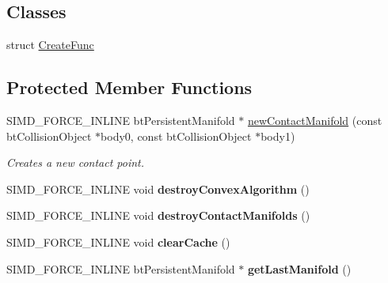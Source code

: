 \subsection*{Classes}
\begin{DoxyCompactItemize}
\item 
struct \hyperlink{structbtGImpactCollisionAlgorithm_1_1CreateFunc}{Create\+Func}
\end{DoxyCompactItemize}
\subsection*{Protected Member Functions}
\begin{DoxyCompactItemize}
\item 
\mbox{\label{classbtGImpactCollisionAlgorithm_a39b6aae298182026902401b138ebd716}} 
S\+I\+M\+D\+\_\+\+F\+O\+R\+C\+E\+\_\+\+I\+N\+L\+I\+NE bt\+Persistent\+Manifold $\ast$ \hyperlink{classbtGImpactCollisionAlgorithm_a39b6aae298182026902401b138ebd716}{new\+Contact\+Manifold} (const bt\+Collision\+Object $\ast$body0, const bt\+Collision\+Object $\ast$body1)
\begin{DoxyCompactList}\small\item\em Creates a new contact point. \end{DoxyCompactList}\item 
\mbox{\label{classbtGImpactCollisionAlgorithm_a6fba8aeaadd20c3d882f20088fbeffdc}} 
S\+I\+M\+D\+\_\+\+F\+O\+R\+C\+E\+\_\+\+I\+N\+L\+I\+NE void {\bfseries destroy\+Convex\+Algorithm} ()
\item 
\mbox{\label{classbtGImpactCollisionAlgorithm_a5d5bc255d50740600f6b112b29450c3f}} 
S\+I\+M\+D\+\_\+\+F\+O\+R\+C\+E\+\_\+\+I\+N\+L\+I\+NE void {\bfseries destroy\+Contact\+Manifolds} ()
\item 
\mbox{\label{classbtGImpactCollisionAlgorithm_a915bad958b4e36822919ff4f0be0bea6}} 
S\+I\+M\+D\+\_\+\+F\+O\+R\+C\+E\+\_\+\+I\+N\+L\+I\+NE void {\bfseries clear\+Cache} ()
\item 
\mbox{\label{classbtGImpactCollisionAlgorithm_a3b50268a08d3ffe3f95f95f52997c57f}} 
S\+I\+M\+D\+\_\+\+F\+O\+R\+C\+E\+\_\+\+I\+N\+L\+I\+NE bt\+Persistent\+Manifold $\ast$ {\bfseries get\+Last\+Manifold} ()

\end{DoxyCompactItemize}

